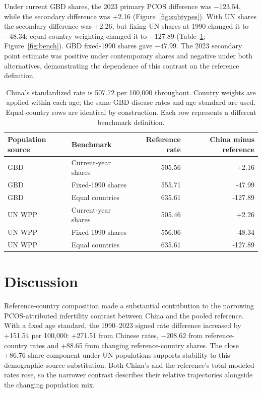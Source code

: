 \documentclass[11pt,a4paper]{article}
\begin{document}
Under current GBD shares, the 2023 primary PCOS difference was $-123.54$, while the secondary difference was +2.16 (Figure~\ref{fig:subtypes}). With UN shares the secondary difference was +2.26, but fixing UN shares at 1990 changed it to $-48.34$; equal-country weighting changed it to $-127.89$ (Table~\ref{tab:bench}; Figure~\ref{fig:bench}). GBD fixed-1990 shares gave $-47.99$. The 2023 secondary point estimate was positive under contemporary shares and negative under both alternatives, demonstrating the dependence of this contrast on the reference definition.

\begin{table}[htbp]\centering\small{}
\caption{Benchmark definition changes the 2023 PCOS secondary infertility contrast.}\label{tab:bench}
\begin{tabular}{llrr}\toprule
Population source & Benchmark & Reference rate & China minus reference\\\midrule
GBD & Current-year shares & 505.56 & +2.16\\
GBD & Fixed-1990 shares & 555.71 & -47.99\\
GBD & Equal countries & 635.61 & -127.89\\
UN WPP & Current-year shares & 505.46 & +2.26\\
UN WPP & Fixed-1990 shares & 556.06 & -48.34\\
UN WPP & Equal countries & 635.61 & -127.89\\
\bottomrule
\end{tabular}
\caption*{China's standardized rate is 507.72 per 100,000 throughout. Country weights are applied within each age; the same GBD disease rates and age standard are used. Equal-country rows are identical by construction. Each row represents a different benchmark definition.}
\end{table}

\section{Discussion}
Reference-country composition made a substantial contribution to the narrowing PCOS-attributed infertility contrast between China and the pooled reference. With a fixed age standard, the 1990--2023 signed rate difference increased by +151.54 per 100,000: +271.51 from Chinese rates, $-208.62$ from reference-country rates and +88.65 from changing reference-country shares. The close +86.76 share component under UN populations supports stability to this demographic-source substitution. Both China's and the reference's total modeled rates rose, so the narrower contrast describes their relative trajectories alongside the changing population mix.
\end{document}
